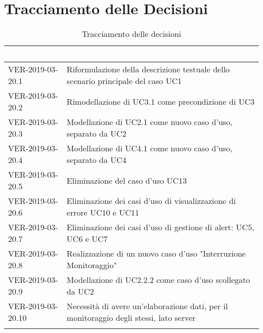 \newpage
\section{Tracciamento delle Decisioni}

\begin{longtable}{|C{.40\textwidth}|C{.60\textwidth}|}
\hline
{}\textbf{\textcolor{white}{Codice}} & \textbf{\textcolor{white}{Decisione}}\\
\hline \hline
\endhead
VER-2019-03-20.1 & Riformulazione della descrizione testuale dello scenario principale del caso UC1\\
\hline
{}VER-2019-03-20.2 & Rimodellazione di UC3.1 come precondizione di UC3\\
\hline
VER-2019-03-20.3 & Modellazione di UC2.1 come nuovo caso d'uso, separato da UC2\\
\hline
{}VER-2019-03-20.4 & Modellazione di UC4.1 come nuovo caso d'uso, separato da UC4\\
\hline
VER-2019-03-20.5 & Eliminazione del caso d'uso UC13\\
\hline
{}VER-2019-03-20.6 & Eliminazione dei casi d'uso di visualizzazione di errore UC10 e UC11\\
\hline
VER-2019-03-20.7 & Eliminazione dei casi d'uso di gestione di alert: UC5, UC6 e UC7\\
\hline
{}VER-2019-03-20.8 & Realizzazione di un nuovo caso d'uso "Interruzione Monitoraggio"\\
\hline
VER-2019-03-20.9 & Modellazione di UC2.2.2 come caso d'uso scollegato da UC2\\
\hline
{}VER-2019-03-20.10 & Necessità di avere un'elaborazione dati, per il monitoraggio degli stessi, lato server\\
\hline
\caption{Tracciamento delle decisioni}
\end{longtable}
